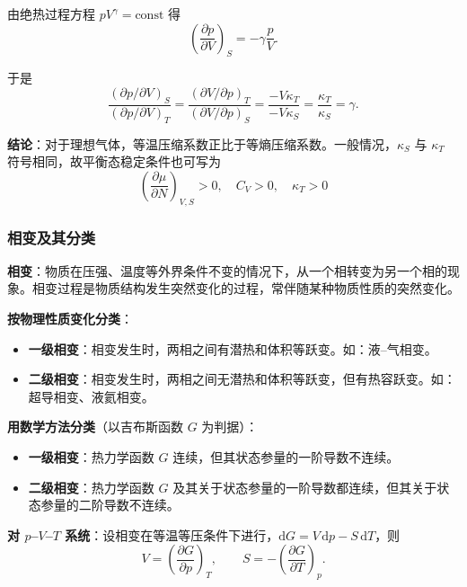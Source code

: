 \documentclass[UTF8]{ctexart}
\theoremstyle{definition}
\begin{document}
由绝热过程方程 $pV^\gamma=\text{const}$ 得
\begin{equation}
\left(\frac{\partial p}{\partial V}\right)_S = -\gamma\frac{p}{V}.
\end{equation}

于是
\begin{equation}
\frac{(\partial p/\partial V)_S}{(\partial p/\partial V)_T}
= \frac{(\partial V/\partial p)_T}{(\partial V/\partial p)_S}
= \frac{-V\kappa_T}{-V\kappa_S}
= \frac{\kappa_T}{\kappa_S} = \gamma.
\end{equation}

\textbf{结论}：对于理想气体，等温压缩系数正比于等熵压缩系数。一般情况，$\kappa_S$ 与 $\kappa_T$ 符号相同，故平衡态稳定条件也可写为
\begin{equation}
\boxed{\left(\frac{\partial\mu}{\partial N}\right)_{V,S} > 0,\quad C_V > 0,\quad \kappa_T > 0}
\end{equation}


\subsubsection*{相变及其分类}

\textbf{相变}：物质在压强、温度等外界条件不变的情况下，从一个相转变为另一个相的现象。相变过程是物质结构发生突然变化的过程，常伴随某种物质性质的突然变化。

\textbf{按物理性质变化分类}：
\begin{itemize}
\item \textbf{一级相变}：相变发生时，两相之间有潜热和体积等跃变。如：液--气相变。
\item \textbf{二级相变}：相变发生时，两相之间无潜热和体积等跃变，但有热容跃变。如：超导相变、液氦相变。
\end{itemize}

\textbf{用数学方法分类}（以吉布斯函数 $G$ 为判据）：
\begin{itemize}
\item \textbf{一级相变}：热力学函数 $G$ 连续，但其状态参量的一阶导数不连续。
\item \textbf{二级相变}：热力学函数 $G$ 及其关于状态参量的一阶导数都连续，但其关于状态参量的二阶导数不连续。
\end{itemize}

\textbf{对 $p$--$V$--$T$ 系统}：设相变在等温等压条件下进行，$\mathrm{d}G=V\,\mathrm{d}p-S\,\mathrm{d}T$，则
\begin{equation}
V = \left(\frac{\partial G}{\partial p}\right)_T,\qquad
S = -\left(\frac{\partial G}{\partial T}\right)_p.
\end{equation}
\end{document}

